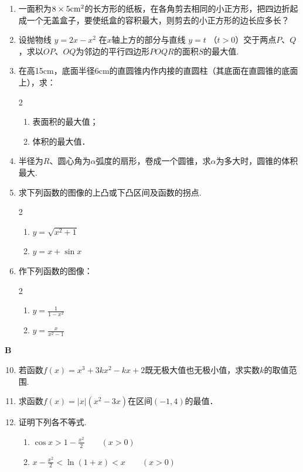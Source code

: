 \begin{enumerate}
\item 一面积为$8\times 5{\rm cm}^{2}$的长方形的纸板，在各角剪去相同的小正方形，把四边折起成一个无盖盒子，要使纸盒的容积最大，则剪去的小正方形的边长应多长？
\item 设抛物线 $y=2x-x^2$ 在$x$轴上方的部分与直线 $y=t$
（$t>0$）交于两点$P$、$Q$，求以$OP$、$OQ$为邻边的平行四边形$POQR$的面积$S$的最大值.
\item 在高15cm，底面半径6cm的直圆锥内作内接的直圆柱（其底面在直圆锥的底面上），求：
\begin{multicols}{2}
\begin{enumerate}[(1)]
    \item 表面积的最大值；
    \item 体积的最大值．
\end{enumerate}
\end{multicols}
\item 半径为$R$、圆心角为$\alpha$弧度的扇形，卷成一个圆锥，求$\alpha$为多大时，圆锥的体积最大.
\item 求下列函数的图像的上凸或下凸区间及函数的拐点.
\begin{multicols}{2}
    \begin{enumerate}[(1)]
        \item $y=\sqrt{x^2+1}$
        \item $y=x+\sin x$
    \end{enumerate}
\end{multicols}

\item 作下列函数的图像：
\begin{multicols}{2}
    \begin{enumerate}[(1)]
        \item $y=\frac{1}{1-x^2}$
        \item $y=\frac{x}{x^2-1}$
    \end{enumerate}
\end{multicols}
\end{enumerate}

\begin{center}
    \bfseries B
\end{center}

\begin{enumerate}\setcounter{enumi}{9}
    \item 若函数$f(x)=x^3+3kx^2-kx+2$既无极大值也无极小值，求实数$k$的取值范围.
    \item   求函数$f(x)=|x|(x^2-3x)$在区间$(-1,4)$的最值．
    \item   证明下列各不等式.
\begin{enumerate}[(1)]
    \item $\cos x>1-\frac{x^2}{2}\qquad (x>0)$
    \item $x-\frac{x^2}{2}<\ln(1+x)<x\qquad (x>0)$
\end{enumerate}
\end{enumerate}

